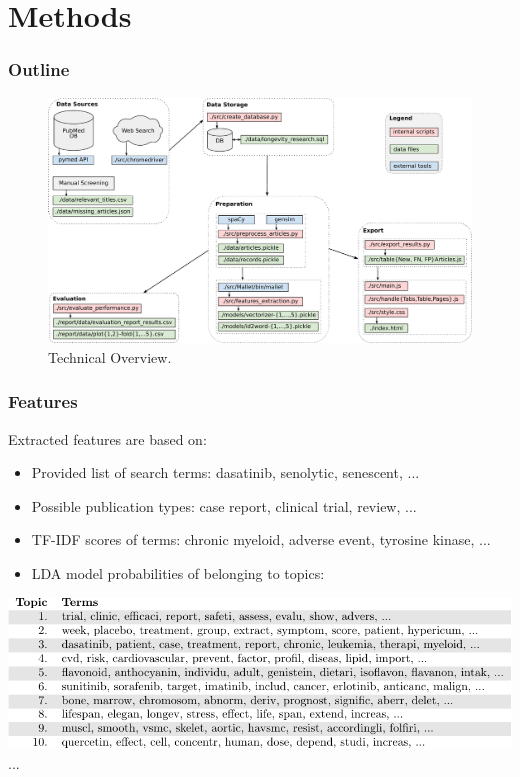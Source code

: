 \documentclass[10pt, xcolor={dvipsnames}]{beamer}
\begin{document}
\section{Methods}
\begin{frame}
\frametitle{Outline}
\begin{figure}[H]
\centering
\includegraphics[width=1\textwidth]{../report/diagrams/technical-overview/technical-overview-crop.pdf}
\caption{Technical Overview.}
\end{figure}
\end{frame}

\begin{frame}
\frametitle{Features}
Extracted features are based on:
\begin{itemize}
\item Provided list of search terms: dasatinib, senolytic, senescent, ...
\item Possible publication types: case report, clinical trial, review, ...
\item TF-IDF scores of terms: chronic myeloid, adverse event, tyrosine kinase, ...
\item LDA model probabilities of belonging to topics: \\
\end{itemize}
\vspace{1mm}
\centering
\includegraphics[width=1\textwidth]{../report/tables/topics/topics-crop.pdf}
...
\end{frame}
\end{document}
